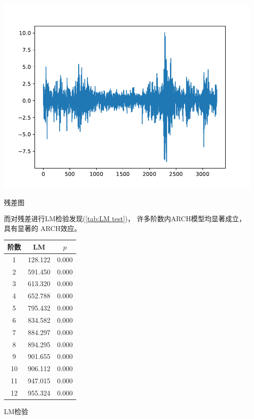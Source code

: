 \documentclass[cn]{homework}
\begin{document}
    \begin{marginfigure}
        \centering
        \includegraphics[width=\linewidth]{resid}
        \caption{残差图}
        \label{fig:resid}
    \end{marginfigure}

    而对残差进行LM检验发现(\cref{tab:LM test})，
    许多阶数内ARCH模型均显著成立，具有显著的
    ARCH效应。

    \begin{margintable}
        \centering
        \begin{tabular}{ccc}
            \toprule
            阶数 & LM & $p$\\
            \midrule
            1&    128.122&      0.000  \\
            2&    591.450&      0.000  \\
            3&    613.320&      0.000  \\ 
            4&    652.788&      0.000  \\
            5&    795.432&      0.000  \\
            6&    834.582&      0.000  \\
            7&    884.297&      0.000  \\
            8&    894.295&      0.000  \\
            9&    901.655&      0.000  \\
            10&    906.112&      0.000  \\
            11&    947.015&      0.000  \\
            12&    955.324&      0.000  \\
            \bottomrule
        \end{tabular}
        \caption{LM检验}
        \label{tab:LM test}
    \end{margintable}
\end{document}
